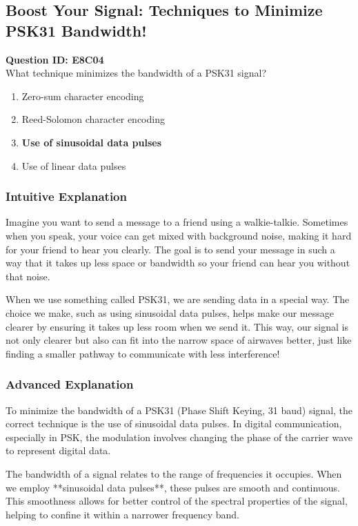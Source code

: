 \subsection{Boost Your Signal: Techniques to Minimize PSK31 Bandwidth!}

\begin{tcolorbox}
\textbf{Question ID: E8C04} \\
What technique minimizes the bandwidth of a PSK31 signal? 
\begin{enumerate}[label=\Alph*.]
    \item Zero-sum character encoding
    \item Reed-Solomon character encoding
    \item \textbf{Use of sinusoidal data pulses}
    \item Use of linear data pulses
\end{enumerate}
\end{tcolorbox}

\subsubsection{Intuitive Explanation}
Imagine you want to send a message to a friend using a walkie-talkie. Sometimes when you speak, your voice can get mixed with background noise, making it hard for your friend to hear you clearly. The goal is to send your message in such a way that it takes up less space or bandwidth so your friend can hear you without that noise. 

When we use something called PSK31, we are sending data in a special way. The choice we make, such as using sinusoidal data pulses, helps make our message clearer by ensuring it takes up less room when we send it. This way, our signal is not only clearer but also can fit into the narrow space of airwaves better, just like finding a smaller pathway to communicate with less interference!

\subsubsection{Advanced Explanation}
To minimize the bandwidth of a PSK31 (Phase Shift Keying, 31 baud) signal, the correct technique is the use of sinusoidal data pulses. In digital communication, especially in PSK, the modulation involves changing the phase of the carrier wave to represent digital data. 

The bandwidth of a signal relates to the range of frequencies it occupies. When we employ **sinusoidal data pulses**, these pulses are smooth and continuous. This smoothness allows for better control of the spectral properties of the signal, helping to confine it within a narrower frequency band. 

